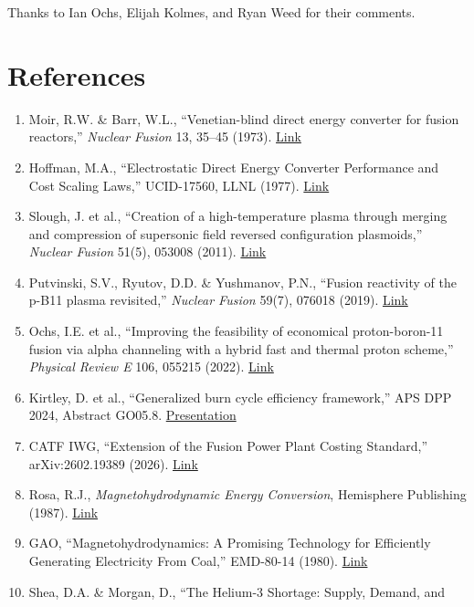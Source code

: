 \documentclass{article}
\begin{document}
Thanks to Ian Ochs, Elijah Kolmes, and Ryan Weed for their comments.

\section*{References}\label{references}

\begin{enumerate}
\item Moir, R.W. \& Barr, W.L., ``Venetian-blind direct energy converter for
  fusion reactors,'' \emph{Nuclear Fusion} 13, 35--45 (1973).
  \href{https://iopscience.iop.org/article/10.1088/0029-5515/13/1/005}{Link}
\item Hoffman, M.A., ``Electrostatic Direct Energy Converter Performance and
  Cost Scaling Laws,'' UCID-17560, LLNL (1977).
  \href{https://www.osti.gov/biblio/7218298}{Link}
\item Slough, J. et al., ``Creation of a high-temperature plasma through
  merging and compression of supersonic field reversed configuration
  plasmoids,'' \emph{Nuclear Fusion} 51(5), 053008 (2011).
  \href{https://doi.org/10.1088/0029-5515/51/5/053008}{Link}
\item Putvinski, S.V., Ryutov, D.D. \& Yushmanov, P.N., ``Fusion reactivity
  of the p-B11 plasma revisited,'' \emph{Nuclear Fusion} 59(7), 076018
  (2019). \href{https://doi.org/10.1088/1741-4326/ab1a60}{Link}
\item Ochs, I.E. et al., ``Improving the feasibility of economical
  proton-boron-11 fusion via alpha channeling with a hybrid fast and
  thermal proton scheme,'' \emph{Physical Review E} 106, 055215 (2022).
  \href{https://doi.org/10.1103/PhysRevE.106.055215}{Link}
\item Kirtley, D. et al., ``Generalized burn cycle efficiency framework,''
  APS DPP 2024, Abstract GO05.8.
  \href{https://youtu.be/5nHmqk1cI2E?t=505}{Presentation}
\item CATF IWG, ``Extension of the Fusion Power Plant Costing Standard,''
  arXiv:2602.19389 (2026). \href{https://arxiv.org/abs/2602.19389}{Link}
\item Rosa, R.J., \emph{Magnetohydrodynamic Energy Conversion}, Hemisphere
  Publishing (1987).
  \href{https://inis.iaea.org/records/4ss3z-rqd83}{Link}
\item GAO, ``Magnetohydrodynamics: A Promising Technology for Efficiently
  Generating Electricity From Coal,'' EMD-80-14 (1980).
  \href{https://www.gao.gov/products/emd-80-14}{Link}
\item Shea, D.A. \& Morgan, D., ``The Helium-3 Shortage: Supply, Demand, and

\end{enumerate}
\end{document}
